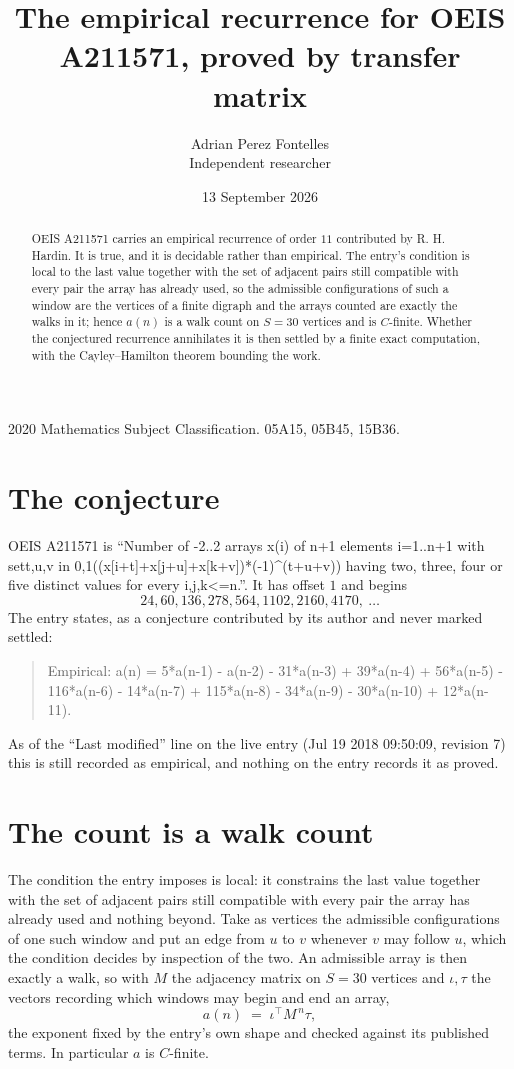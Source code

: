 \documentclass[11pt,a4paper]{article}
\title{The empirical recurrence for OEIS A211571, proved by transfer matrix}
\author{Adrian Perez Fontelles\\ \small Independent researcher}
\date{13 September 2026}
\theoremstyle{plain}
\theoremstyle{definition}
\begin{document}
\maketitle

\begin{abstract}
OEIS A211571 carries an empirical recurrence of order $11$ contributed by R. H. Hardin. It is
true, and it is decidable rather than empirical. The entry's condition is local to the last value together with the set of adjacent pairs still compatible with every pair the array has already used, so
the admissible configurations of such a window are the vertices of a finite digraph and the
arrays counted are exactly the walks in it; hence $a(n)$ is a walk count on $S=30$ vertices
and is $C$-finite. Whether the conjectured recurrence annihilates it is then settled by a
finite exact computation, with the Cayley--Hamilton theorem bounding the work.
\end{abstract}

\noindent\small 2020 Mathematics Subject Classification. 05A15, 05B45, 15B36.\normalsize

\section{The conjecture}

OEIS A211571 is ``Number of -2..2 arrays x(i) of n+1 elements i=1..n+1 with set{t,u,v in 0,1}((x[i+t]+x[j+u]+x[k+v])*(-1)\^{}(t+u+v)) having two, three, four or five distinct values for every i,j,k<=n.''. It has offset $1$ and begins
\[
24, 60, 136, 278, 564, 1102, 2160, 4170,\ \dots
\]
The entry states, as a conjecture contributed by its author and never marked settled:
\begin{quote}
Empirical: a(n) = 5*a(n-1) - a(n-2) - 31*a(n-3) + 39*a(n-4) + 56*a(n-5) - 116*a(n-6) - 14*a(n-7) + 115*a(n-8) - 34*a(n-9) - 30*a(n-10) + 12*a(n-11).
\end{quote}
As of the ``Last modified'' line on the live entry (Jul 19 2018 09:50:09, revision 7) this is still
recorded as empirical, and nothing on the entry records it as proved.

\section{The count is a walk count}

The condition the entry imposes is local: it constrains the last value together with the set of adjacent pairs still compatible with every pair the array has already used and nothing beyond. Take as
vertices the admissible configurations of one such window and put an edge from $u$ to $v$
whenever $v$ may follow $u$, which the condition decides by inspection of the two. An
admissible array is then exactly a walk, so with $M$ the adjacency matrix on $S=30$ vertices
and $\iota,\tau$ the vectors recording which windows may begin and end an array,
\[
a(n)\;=\;\iota^{\!\top}M^{\,n}\tau ,
\]
the exponent fixed by the entry's own shape and checked against its published terms. In
particular $a$ is $C$-finite.
\end{document}
